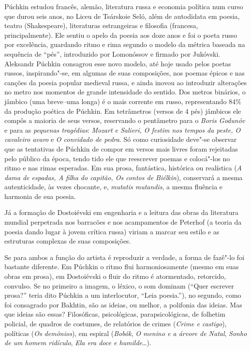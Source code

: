 Púchkin estudou francês, alemão, literatura russa e economia política
num curso que durou seis anos, no Liceu de Tsárskoie Seló, além de autodidata em poesia, teatro (Shakespeare), literaturas
estrangeiras e filosofia (francesa, principalmente). Ele sentiu o apelo da poesia aos doze anos e foi o poeta
russo por excelência, guardando ritmo e rima segundo o modelo da métrica baseada na sequência de ``pés'', introduzido por Lomonóssov e firmado por Jukóvski. Aleksandr Púchkin consagrou esse novo modelo, até hoje usado pelos poetas russos, inspirando"-se, em algumas de suas composições, nos poemas épicos e nas canções da poesia popular medieval russa, e ainda inovou ao introduzir alterações no metro nos momentos de grande intensidade do sentido. Dos metros binários, o jâmbico (uma breve--uma longa) é o mais corrente em russo, representando 84\% da produção poética de Púchkin. Em tetrâmetros (versos de 4 pés) jâmbicos ele compôs a maioria de seus versos, reservando o pentâmetro para o \emph{Boris Godunóv} e para as \emph{pequenas tragédias}: \emph{Mozart e Salieri, O festim nos tempos da peste, O cavaleiro avaro} e \emph{O convidado de pedra}. Só como curiosidade deve"-se observar que as tentativas de Púchkin de compor em versos mais livres foram rejeitadas pelo público da época, tendo tido ele que reescrever poemas e colocá"-los no ritmo e nas rimas esperadas. Em sua prosa, fantástica, histórica ou realística (\emph{A dama de espadas, A filha do capitão, Os contos de Biélkin}), conservará a mesma autenticidade, às vezes chocante, e, \emph{mutatis mutandis}, a mesma fluência e harmonia de sua poesia.

Já a formação de Dostoiévski em engenharia e a leitura das obras
da literatura mundial perpetrada nos barracões e nos acampamentos de
Peterhof (a teoria da poesia dando lugar à jovem crítica russa) viriam a marcar seu estilo e as estruturas complexas de suas composições.

Se para ambos a função do artista é reproduzir a verdade, a forma
de fazê"-lo foi bastante diferente. Em Púchkin o ritmo flui
harmoniosamente (mesmo em suas obras em prosa), em Dostoiévski o
fluir do ritmo é atormentado, retorcido, convulso. Se no primeiro
a imagem, o léxico, o som dominam (``Quer escrever prosa?'' teria
dito Púchkin a um interlocutor, ``Leia poesia.''), no segundo,
como foi consagrado por Bakhtin, são as ideias, ou melhor, a
polifonia das ideias. Mas que ideias são essas? Filosóficas, psicológicas, parapsicológicas, de folhetim policial, de quadros de costumes, de relatórios de crimes (\emph{Crime e
castigo}), políticas (\emph{Os demônios}), em espiral
(\emph{Bobók}, \emph{O menino e a árvore de Natal}, \emph{Sonho de um homem ridículo}, \emph{Ela era doce e humilde}\ldots{}).

